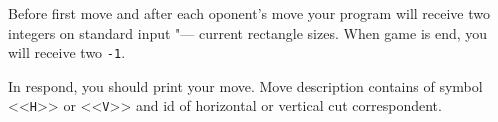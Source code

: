Before first move and after each oponent's move your program will receive two integers on standard input "--- current rectangle sizes.
When game is end, you will receive two \texttt{-1}.

In respond, you should print your move. 
Move description contains of symbol <<\texttt{H}>> or <<\texttt{V}>> and id of horizontal or vertical cut correspondent.



